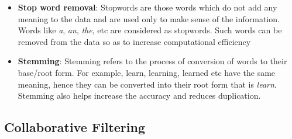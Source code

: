\documentclass[a4paper,10pt]{article}
\begin{document}
\begin{itemize}
    \item \textbf{Stop word removal}: Stopwords are those words which do not add any meaning to the data and are used only to make sense of the information. Words like \textit{a}, \textit{an}, \textit{the}, etc are considered as stopwords. Such words can be removed from the data so as to increase computational efficiency
\end{itemize}

\begin{itemize}
    \item \textbf{Stemming}: Stemming refers to the process of conversion of words to their base/root form. For example, learn, learning, learned etc have the same meaning, hence they can be converted into their root form that is \textit{learn}. Stemming also helps increase the accuracy and reduces duplication. 
\end{itemize}



\subsection{Collaborative Filtering}
\end{document}
